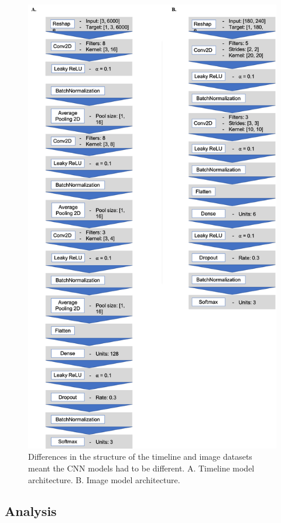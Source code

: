 \documentclass[
  english,
  man,floatsintext]{apa6}
\begin{document}
\begin{figure}
\centering
\includegraphics{images/models.png}
\caption{\label{fig:models}Differences in the structure of the timeline and image datasets meant the CNN models had to be different. A. Timeline model architecture. B. Image model architecture.}
\end{figure}

\subsection{Analysis}
\end{document}
